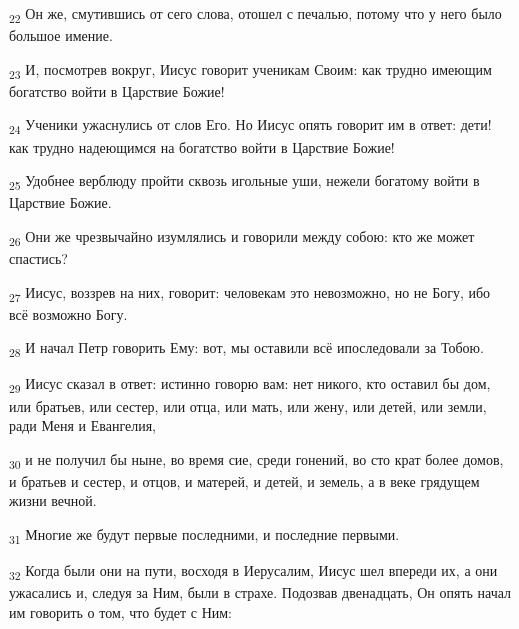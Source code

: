 \begin{tcolorbox}
\textsubscript{22} Он же, смутившись от сего слова, отошел с печалью, потому что у него было большое имение.
\end{tcolorbox}
\begin{tcolorbox}
\textsubscript{23} И, посмотрев вокруг, Иисус говорит ученикам Своим: как трудно имеющим богатство войти в Царствие Божие!
\end{tcolorbox}
\begin{tcolorbox}
\textsubscript{24} Ученики ужаснулись от слов Его. Но Иисус опять говорит им в ответ: дети! как трудно надеющимся на богатство войти в Царствие Божие!
\end{tcolorbox}
\begin{tcolorbox}
\textsubscript{25} Удобнее верблюду пройти сквозь игольные уши, нежели богатому войти в Царствие Божие.
\end{tcolorbox}
\begin{tcolorbox}
\textsubscript{26} Они же чрезвычайно изумлялись и говорили между собою: кто же может спастись?
\end{tcolorbox}
\begin{tcolorbox}
\textsubscript{27} Иисус, воззрев на них, говорит: человекам это невозможно, но не Богу, ибо всё возможно Богу.
\end{tcolorbox}
\begin{tcolorbox}
\textsubscript{28} И начал Петр говорить Ему: вот, мы оставили всё ипоследовали за Тобою.
\end{tcolorbox}
\begin{tcolorbox}
\textsubscript{29} Иисус сказал в ответ: истинно говорю вам: нет никого, кто оставил бы дом, или братьев, или сестер, или отца, или мать, или жену, или детей, или земли, ради Меня и Евангелия,
\end{tcolorbox}
\begin{tcolorbox}
\textsubscript{30} и не получил бы ныне, во время сие, среди гонений, во сто крат более домов, и братьев и сестер, и отцов, и матерей, и детей, и земель, а в веке грядущем жизни вечной.
\end{tcolorbox}
\begin{tcolorbox}
\textsubscript{31} Многие же будут первые последними, и последние первыми.
\end{tcolorbox}
\begin{tcolorbox}
\textsubscript{32} Когда были они на пути, восходя в Иерусалим, Иисус шел впереди их, а они ужасались и, следуя за Ним, были в страхе. Подозвав двенадцать, Он опять начал им говорить о том, что будет с Ним:
\end{tcolorbox}

